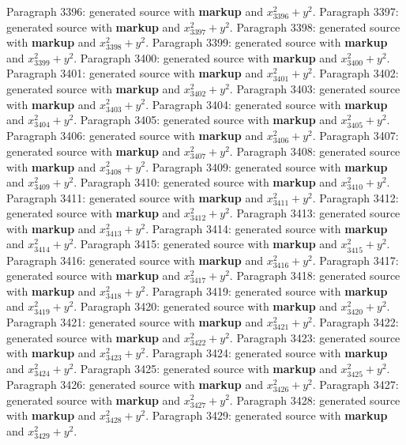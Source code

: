 \documentclass{article}
\begin{document}
Paragraph 3396: generated source with \textbf{markup} and $x_{3396}^2 + y^2$.
Paragraph 3397: generated source with \textbf{markup} and $x_{3397}^2 + y^2$.
Paragraph 3398: generated source with \textbf{markup} and $x_{3398}^2 + y^2$.
Paragraph 3399: generated source with \textbf{markup} and $x_{3399}^2 + y^2$.
Paragraph 3400: generated source with \textbf{markup} and $x_{3400}^2 + y^2$.
Paragraph 3401: generated source with \textbf{markup} and $x_{3401}^2 + y^2$.
Paragraph 3402: generated source with \textbf{markup} and $x_{3402}^2 + y^2$.
Paragraph 3403: generated source with \textbf{markup} and $x_{3403}^2 + y^2$.
Paragraph 3404: generated source with \textbf{markup} and $x_{3404}^2 + y^2$.
Paragraph 3405: generated source with \textbf{markup} and $x_{3405}^2 + y^2$.
Paragraph 3406: generated source with \textbf{markup} and $x_{3406}^2 + y^2$.
Paragraph 3407: generated source with \textbf{markup} and $x_{3407}^2 + y^2$.
Paragraph 3408: generated source with \textbf{markup} and $x_{3408}^2 + y^2$.
Paragraph 3409: generated source with \textbf{markup} and $x_{3409}^2 + y^2$.
Paragraph 3410: generated source with \textbf{markup} and $x_{3410}^2 + y^2$.
Paragraph 3411: generated source with \textbf{markup} and $x_{3411}^2 + y^2$.
Paragraph 3412: generated source with \textbf{markup} and $x_{3412}^2 + y^2$.
Paragraph 3413: generated source with \textbf{markup} and $x_{3413}^2 + y^2$.
Paragraph 3414: generated source with \textbf{markup} and $x_{3414}^2 + y^2$.
Paragraph 3415: generated source with \textbf{markup} and $x_{3415}^2 + y^2$.
Paragraph 3416: generated source with \textbf{markup} and $x_{3416}^2 + y^2$.
Paragraph 3417: generated source with \textbf{markup} and $x_{3417}^2 + y^2$.
Paragraph 3418: generated source with \textbf{markup} and $x_{3418}^2 + y^2$.
Paragraph 3419: generated source with \textbf{markup} and $x_{3419}^2 + y^2$.
Paragraph 3420: generated source with \textbf{markup} and $x_{3420}^2 + y^2$.
Paragraph 3421: generated source with \textbf{markup} and $x_{3421}^2 + y^2$.
Paragraph 3422: generated source with \textbf{markup} and $x_{3422}^2 + y^2$.
Paragraph 3423: generated source with \textbf{markup} and $x_{3423}^2 + y^2$.
Paragraph 3424: generated source with \textbf{markup} and $x_{3424}^2 + y^2$.
Paragraph 3425: generated source with \textbf{markup} and $x_{3425}^2 + y^2$.
Paragraph 3426: generated source with \textbf{markup} and $x_{3426}^2 + y^2$.
Paragraph 3427: generated source with \textbf{markup} and $x_{3427}^2 + y^2$.
Paragraph 3428: generated source with \textbf{markup} and $x_{3428}^2 + y^2$.
Paragraph 3429: generated source with \textbf{markup} and $x_{3429}^2 + y^2$.
\end{document}
